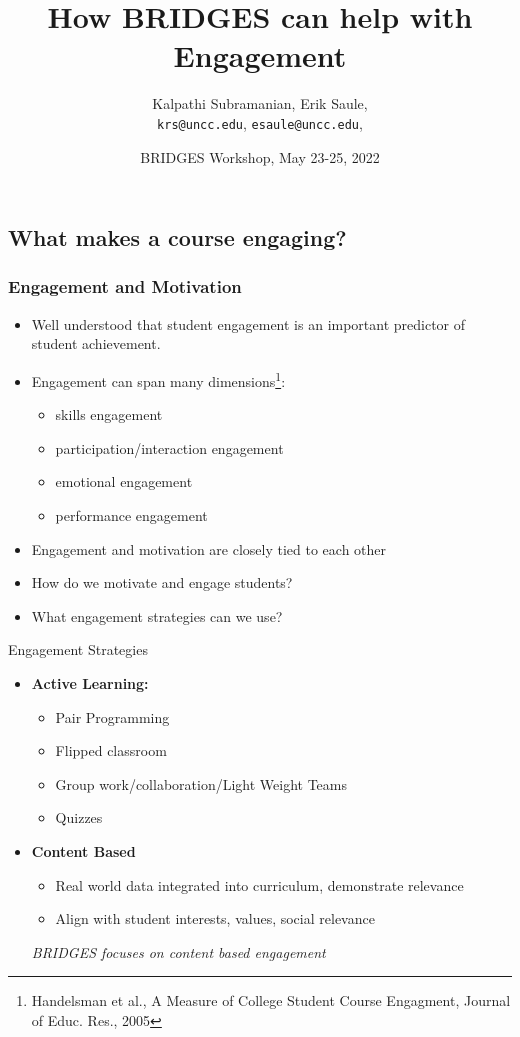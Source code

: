 \documentclass[aspectratio=169]{beamer}
\title{How BRIDGES can help with Engagement}
\subtitle{}
\author{Kalpathi Subramanian, Erik Saule, \\\texttt{krs@uncc.edu}, \texttt{esaule@uncc.edu}, }
\institute{$^1$The University of North Carolina at Charlotte}
\date{BRIDGES Workshop, May 23-25, 2022}
\begin{document}
\begin{frame}
\titlepage
\end{frame}




\subsection{What makes a course engaging?}

\begin{frame}
	\frametitle{Engagement and Motivation}
\begin{itemize} 
	\item Well understood that student engagement is an important
		predictor of student achievement.
	\item Engagement can span many dimensions\footnote{Handelsman et al., 
	A Measure of College Student Course Engagment, Journal of Educ. Res., 2005}: 
		\begin{itemize}
			\item skills engagement
			\item participation/interaction engagement
			\item emotional engagement
			\item performance engagement
		\end{itemize}
	\item Engagement and motivation are closely tied to each other
	\item How do we motivate and engage students? 
	\item What engagement  strategies  can we use? 
\end{itemize}
\end{frame}
\begin{frame}{Engagement Strategies}
\begin{itemize}
	\item \textbf{Active Learning:}
	\begin{itemize}
		\item Pair Programming
		\item Flipped classroom
		\item Group work/collaboration/Light Weight Teams
		\item Quizzes
	\end{itemize}
	\item \textbf{Content Based}
	\begin{itemize}
		\item Real world data integrated into  curriculum, demonstrate
			relevance
		\item Align with student interests, values, social relevance
	\end{itemize}
\vspace*{0.2in}
\textsl{\large BRIDGES focuses on content based engagement}
\end{itemize}
\end{frame}
\end{document}

